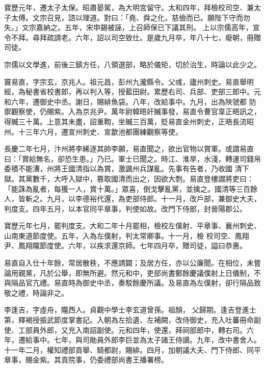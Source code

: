 \begin{pinyinscope}
 寶歷元年，遷太子太保。昭肅晏駕，為大明宮留守。太和四年，拜檢校司空、兼太子太傅。文宗召見，諮以理道。對曰：「堯、舜之化，慈儉而已。願陛下守而勿失。」文宗嘉納之。五年，宋申錫被誣，上召師保已下議其刑。
 上以宗儒高年，宣令不拜。尋拜疏請老。六年，詔以司空致仕。是歲九月卒，年八十七，廢朝，冊贈司徒。



 宗儒以文學進，前後三鎮方任，八領選部，略於儀矩，切於治生，時論以此少之。



 竇易直，字宗玄，京兆人。祖元昌，彭州九瀧縣令。父彧，廬州刺史。易直舉明經，為秘書省校書郎，再以判入等，授藍田尉。累歷右司、兵部、吏部三郎中。元和六年，遷御史中丞。謝日，賜緋魚袋。八年，改給事中。九月，出為陜虢都
 防禦觀察使，仍賜紫。入為京兆尹。萬年尉韓晤奸贓事發，易直令曹官韋正晤訊之，得贓三十萬。上意其未盡，詔重鞫，坐贓三百萬，貶易直金州刺史，正晤長流昭州。十三年六月，遷宣州刺史、宣歙池都團練觀察等使。



 長慶二年七月，汴州將李絺逐其帥李願，易直聞之，欲出官物以賞軍。或謂易直曰：「賞給無名，卻恐生患。」乃已。軍士已聞之。時江、淮旱，水淺，轉運司錢帛委積不能漕，州將王國清指以為賞，激諷州兵謀亂。先事有告者，乃收國
 清下獄。其黨數千，大呼入獄中，篡取國清而出之，因欲大剽。易直登樓謂將吏曰：「能誅為亂者，每獲一人，賞十萬。」眾喜，倒戈擊亂黨，並擒之。國清等三百餘人，皆斬之。九月，以李德裕代還，為吏部侍郎。十一月，改戶部，兼御史大夫，判度支。四年五月，以本官同平章事，判使如故。改門下侍郎，封晉陽郡公。



 寶歷元年七月，罷判度支。大和二年十月罷相，檢校左僕射、平章事、襄州刺史、山南東道節度使。五年，入為左僕射，判太常卿事。十一月，檢
 校司空、鳳翔尹、鳳翔隴節度使。六年，以疾求還京師。七年四月卒，贈司徒，謚曰恭惠。



 易直自入仕十年餘，常居散秩，不應請闢；及居方任，亦以公廉聞。在相位，未嘗論用親黨，凡於公舉，即無所避。然元和中，吏部尚書鄭餘慶議僕射上日儀制，不與隔品官亢禮。易直時為御史中丞，奏駁餘慶所議。及易直為左僕射，卻行隔品致敬之禮，時論非之。



 李逢吉，字虛舟，隴西人。貞觀中學士李玄道曾孫。祖顏，
 父歸期。逢吉登進士第，釋褐授振武節度掌書記。入朝為左拾遺、左補闕，改侍御史，充入吐蕃冊命副使、工部員外郎，又充入南詔副使。元和四年，使還，拜祠部郎中，轉右司。六年，遷給事中。七年，與司勛員外郎李巨並為太子諸王侍讀。九年，改中書舍人。十一年二月，權知禮部貢舉、騎都尉，賜緋。四月，加朝議大夫、門下侍郎、同平章事，賜金紫。其貢院事，仍委禮部尚書王播署榜。




\end{pinyinscope}
